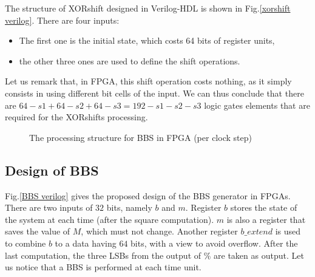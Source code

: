 The structure of XORshift designed in Verilog-HDL is shown in Fig.\ref{xorshift verilog}. There are four inputs:
\begin{itemize}
\item The first one is the initial state, which costs 64 bits 
of register units,
\item the other three ones are used to define the shift operations.
\end{itemize}
Let us remark that, in FPGA, this shift operation costs nothing,
as it simply consists in using different bit cells of the input. 
We can thus conclude that there are $64 - s1 + 64 -s2 + 64 -s3 
= 192 - s1 - s2 - s3$ logic gates elements that are required for
the XORshifts processing. 
\begin{figure}
\begin{center}
\end{center}
\caption{The processing structure for BBS in FPGA (per clock step)}
\end{figure}

\subsection{Design of BBS}
Fig.\ref{BBS verilog} gives the proposed design of the BBS generator in FPGAs.
There are two inputs of $32$ bits, namely 
$b$ and $m$. 
Register $b$ stores the state of the system
at each time (after the square computation). 
$m$ is also a register that saves the value of $M$, which must not change.
Another register $b\_extend$ 
is used to combine $b$ to a data having $64$ bits, with a view to avoid overflow. 
After the last computation,
the three LSBs from the output of $\%$ are
taken as output. 
Let us notice that a BBS is
 performed at each time unit.


